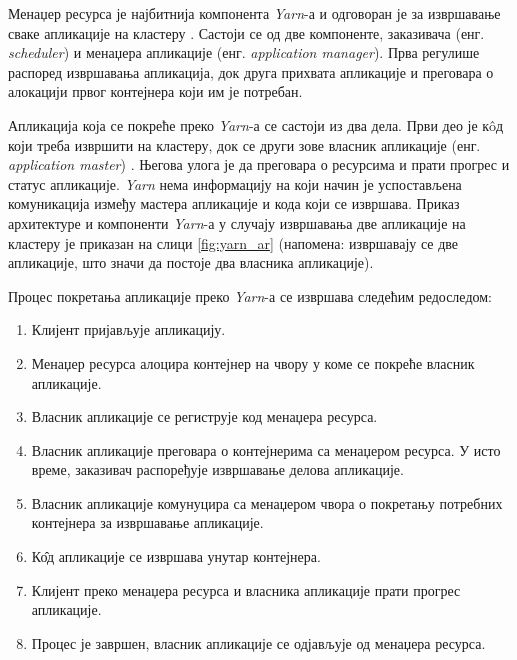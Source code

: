 \documentclass[12pt,oneside]{memoir}
\begin{document}
Менаџер ресурса је најбитнија компонента \textit{Yarn}-а и одговоран је за извршавање сваке апликације на кластеру \cite{hadoop_learning}. Састоји се од две компоненте, заказивача (енг. \textit{scheduler}) и менаџера апликације (енг. \textit{application manager}). Прва регулише распоред извршавања апликација, док друга прихвата апликације и преговара о алокацији првог контејнера који им је потребан.

Апликација која се покреће преко \textit{Yarn}-а се састоји из два дела. Први део је к\^{o}д који треба извршити на кластеру, док се други зове власник апликације (енг. \textit{application master}) \cite{hadoop_learning}. Његова улога је да преговара о ресурсима и прати прогрес и статус апликације. \textit{Yarn} нема информацију на који начин је успостављена комуникација између мастера апликације и кода који се извршава. Приказ архитектуре и компоненти \textit{Yarn}-а у случају извршавања две апликације на кластеру је приказан на слици \ref{fig:yarn_ar} (напомена: извршавају се две апликације, што значи да постоје два власника апликације).

Процес покретања апликације преко \textit{Yarn}-а се извршава следећим редоследом:

\begin{enumerate}
	\item Клијент пријављује апликацију.
	\item Менаџер ресурса алоцира контејнер на чвору у коме се покреће власник апликације.
	\item Власник апликације се региструје код менаџера ресурса.
	\item Власник апликације преговара о контејнерима са менаџером ресурса. У исто време, заказивач распоређује извршавање делова апликације.
	\item Власник апликације комунуцира са менаџером чвора о покретању потребних контејнера за извршавање апликације.
	\item К\^{о}д апликације се извршава унутар контејнера.
	\item Клијент преко менаџера ресурса и власника апликације прати прогрес апликације.
	\item Процес је завршен, власник апликације се одјављује од менаџера ресурса.
\end{enumerate}
\end{document}
